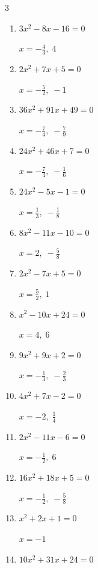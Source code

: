 \begin{multicols}{3}
\begin{enumerate}
  \item $3x^{2}-8x-16=0$

        $\displaystyle x=-\frac{4}{3},\; 4$

  \item $2x^{2}+7x+5=0$

        $\displaystyle x=-\frac{5}{2},\; -1$

  \item $36x^{2}+91x+49=0$

        $\displaystyle x=-\frac{7}{4},\; -\frac{7}{9}$

  \item $24x^{2}+46x+7=0$

        $\displaystyle x=-\frac{7}{4},\; -\frac{1}{6}$

  \item $24x^{2}-5x-1=0$

        $\displaystyle x=\frac{1}{3},\; -\frac{1}{8}$

  \item $8x^{2}-11x-10=0$

        $\displaystyle x=2,\; -\frac{5}{8}$

  \item $2x^{2}-7x+5=0$

        $\displaystyle x=\frac{5}{2},\; 1$

  \item $x^{2}-10x+24=0$

        $\displaystyle x=4,\; 6$

  \item $9x^{2}+9x+2=0$

        $\displaystyle x=-\frac{1}{3},\; -\frac{2}{3}$

\columnbreak %

  \item $4x^{2}+7x-2=0$

        $\displaystyle x=-2,\; \frac{1}{4}$

  \item $2x^{2}-11x-6=0$

        $\displaystyle x=-\frac{1}{2},\; 6$

  \item $16x^{2}+18x+5=0$

        $\displaystyle x=-\frac{1}{2},\; -\frac{5}{8}$

  \item $x^{2}+2x+1=0$

        $\displaystyle x=-1$

  \item $10x^{2}+31x+24=0$


\end{enumerate}
\end{multicols}
